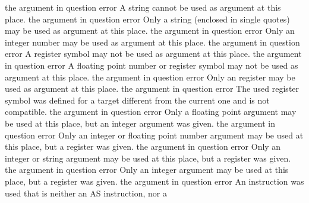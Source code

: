 \documentclass[12pt,twoside]{report}
\newcommand{\asname}{{AS}}
\begin{document}
\begin{description}
               {the argument in question}
               {error}
               {A string cannot be used as argument at this place.}
               {the argument in question}
               {error}
               {Only a string (enclosed in single quotes) may be used as
                argument at this place.}
               {the argument in question}
               {error}
               {Only an integer number may be used as argument at this place.}
               {the argument in question}
               {error}
               {A register symbol may not be used as argument at this place.}
               {the argument in question}
               {error}
               {A floating point number or register symbol may not be used as argument at this place.}
               {the argument in question}
               {error}
               {Only an register may be used as argument at this place.}
               {the argument in question}
               {error}
               {The used register symbol was defined for a target different from
                the current one and is not compatible.}
               {the argument in question}
               {error}
               {Only a floating point argument may be used at this place,
                but an integer argument was given.}
               {the argument in question}
               {error}
               {Only an integer or floating point number argument may be used at this place,
                but a register was given.}
               {the argument in question}
               {error}
               {Only an integer or string argument may be used at this place,
                but a register was given.}
               {the argument in question}
               {error}
               {Only an integer argument may be used at this place,
                but a register was given.}
               {the argument in question}
               {error}
               {An instruction was used that is neither an \asname{} instruction, nor a
}
\end{description}
\end{document}
